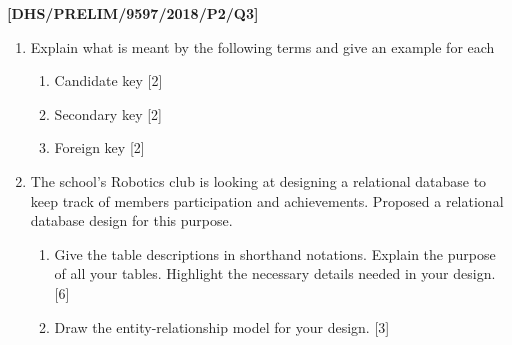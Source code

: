 \item \textbf{{[}DHS/PRELIM/9597/2018/P2/Q3{]} }
\begin{enumerate}
\item Explain what is meant by the following terms and give an example for
each
\begin{enumerate}
\item Candidate key\hfill{} {[}2{]}
\item Secondary key \hfill{} {[}2{]}
\item Foreign key\hfill{} {[}2{]}
\end{enumerate}
\item The school\textquoteright s Robotics club is looking at designing
a relational database to keep track of members participation and achievements.
Proposed a relational database design for this purpose.
\begin{enumerate}
\item Give the table descriptions in shorthand notations. Explain the purpose
of all your tables. Highlight the necessary details needed in your
design.\hfill{} {[}6{]}
\item Draw the entity-relationship model for your design.\hfill{} {[}3{]}
\end{enumerate}
\end{enumerate}
